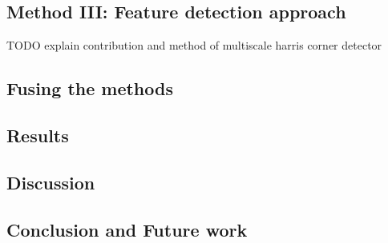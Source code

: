 \subsection{Method III: Feature detection approach}
	TODO explain contribution and method of multiscale harris corner detector

\subsection{Fusing the methods}

\subsection{Results}
\subsection{Discussion}  %
\subsection{Conclusion and Future work}




% 
% 
% 
% 
% 
% 
% 
% 
